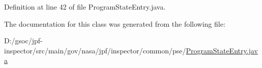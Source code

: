 Definition at line 42 of file Program\+State\+Entry.\+java.



The documentation for this class was generated from the following file\+:\begin{DoxyCompactItemize}
\item 
D\+:/gsoc/jpf-\/inspector/src/main/gov/nasa/jpf/inspector/common/pse/\hyperlink{_program_state_entry_8java}{Program\+State\+Entry.\+java}\end{DoxyCompactItemize}
